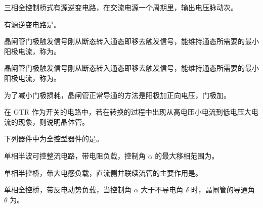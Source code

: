 \documentclass[电力电子]{subfiles}
\begin{document}
\begin{ti}
	三相全控制桥式有源逆变电路，在交流电源一个周期里，输出电压脉动次。
\end{ti}

\begin{ti}
	有源逆变电路是。
\end{ti}

\begin{ti}
	晶闸管门极触发信号刚从断态转入通态即移去触发信号，能维持通态所需要的最小阳极电流，称为。
\end{ti}

\begin{ti}
	晶闸管门极触发信号刚从断态转入通态即移去触发信号，能维持通态所需要的最小阳极电流，称为。
\end{ti}

\begin{ti}
	为了减小门极损耗，晶闸管正常导通的方法是阳极加正向电压，门极加。
\end{ti}

\begin{ti}
	在 GTR 作为开关的电路中，若在转换的过程中出现从高电压小电流到低电压大电流的现象，则说明晶体管。
\end{ti}

\begin{ti}
	下列器件中为全控型器件的是。
\end{ti}

\begin{ti}
	单相半波可控整流电路，带电阻负载，控制角 $\alpha$ 的最大移相范围为。
\end{ti}

\begin{ti}
	单相半控桥，带大电感负载，直流侧并联续流管的主要作用是。
\end{ti}

\begin{ti}
	单相全控桥，带反电动势负载，当控制角 $\alpha$ 大于不导电角 $\delta$ 时，晶闸管的导通角 $\theta$ 为。
	\fourch{$\uppi - \alpha - \delta$}{$\uppi - \alpha + \delta$}{$\uppi - 2 \alpha$}{$\uppi - 2 \delta$}
\end{ti}
\end{document}
